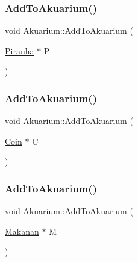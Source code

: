 \mbox{\label{class_akuarium_a167b796ece0cdd537c5c6624ed15760c}} 
\subsubsection{\texorpdfstring{Add\+To\+Akuarium()}{AddToAkuarium()}\hspace{0.1cm}{\footnotesize\ttfamily [2/4]}}
{\footnotesize\ttfamily void Akuarium\+::\+Add\+To\+Akuarium (\begin{DoxyParamCaption}\item[{\mbox{\hyperlink{class_piranha}{Piranha}} $\ast$}]{P }\end{DoxyParamCaption})}

\mbox{\label{class_akuarium_a1f4f9363a6d7293e24768b6f70ee2eae}} 
\subsubsection{\texorpdfstring{Add\+To\+Akuarium()}{AddToAkuarium()}\hspace{0.1cm}{\footnotesize\ttfamily [3/4]}}
{\footnotesize\ttfamily void Akuarium\+::\+Add\+To\+Akuarium (\begin{DoxyParamCaption}\item[{\mbox{\hyperlink{class_coin}{Coin}} $\ast$}]{C }\end{DoxyParamCaption})}

\mbox{\label{class_akuarium_a83bb5abf33474615c762124429a350be}} 
\subsubsection{\texorpdfstring{Add\+To\+Akuarium()}{AddToAkuarium()}\hspace{0.1cm}{\footnotesize\ttfamily [4/4]}}
{\footnotesize\ttfamily void Akuarium\+::\+Add\+To\+Akuarium (\begin{DoxyParamCaption}\item[{\mbox{\hyperlink{class_makanan}{Makanan}} $\ast$}]{M }\end{DoxyParamCaption})}

